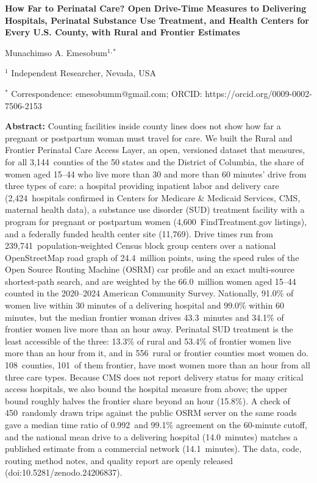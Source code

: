 \documentclass{article}
\begin{document}
\begin{center}
\textbf{How Far to Perinatal Care? Open Drive-Time Measures to Delivering Hospitals, Perinatal  Substance Use Treatment, and Health Centers for Every U.S. County, with Rural and Frontier Estimates}
\end{center}

\begin{center}
Munachimso A. Emesobum$^{1,*}$
\end{center}

$^{1}$ Independent Researcher, Nevada, USA

$^{*}$ Correspondence: emesobumm@gmail.com; ORCID: https://orcid.org/0009-0002-7506-2153

\textbf{Abstract:} Counting facilities inside county lines does not show how far a pregnant or postpartum woman must travel for care. We built the Rural and Frontier Perinatal Care Access Layer, an open, versioned dataset that measures, for all 3,144\ counties of the 50 states and the District of Columbia, the share of women aged 15--44 who live more than 30 and more than 60 minutes' drive from three types of care: a hospital providing inpatient labor and delivery care (2,424\ hospitals confirmed in Centers for Medicare \& Medicaid Services, CMS, maternal health data), a substance use disorder (SUD) treatment facility with a program for pregnant or postpartum women (4,600\ FindTreatment.gov listings), and a federally funded health center site (11,769). Drive times run from 239,741\ population-weighted Census block group centers over a national OpenStreetMap road graph of 24.4\ million points, using the speed rules of the Open Source Routing Machine (OSRM) car profile and an exact multi-source shortest-path search, and are weighted by the 66.0\ million women aged 15--44 counted in the 2020--2024 American Community Survey. Nationally, 91.0\% of women live within 30 minutes of a delivering hospital and 99.0\% within 60 minutes, but the median frontier woman drives 43.3\ minutes and 34.1\% of frontier women live more than an hour away. Perinatal SUD treatment is the least accessible of the three: 13.3\% of rural and 53.4\% of frontier women live more than an hour from it, and in 556\ rural or frontier counties most women do. 108\ counties, 101\ of them frontier, have most women more than an hour from all three care types. Because CMS does not report delivery status for many critical access hospitals, we also bound the hospital measure from above; the upper bound roughly halves the frontier share beyond an hour (15.8\%). A check of 450\ randomly drawn trips against the public OSRM server on the same roads gave a median time ratio of 0.992\ and 99.1\% agreement on the 60-minute cutoff, and the national mean drive to a delivering hospital (14.0\ minutes) matches a published estimate from a commercial network (14.1\ minutes). The data, code, routing method notes, and quality report are openly released (doi:10.5281/zenodo.24206837).
\end{document}
